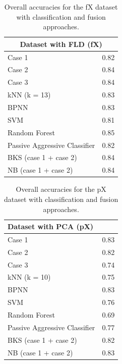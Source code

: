 \documentclass{article}
\begin{document}
\begin{table}[h]
\centering
\begin{tabular}{@{}ll@{}}
\toprule
\multicolumn{2}{c}{Dataset with FLD (fX)}                    \\ \midrule
Case 1                          & 0.82                  
\\
Case 2                          & 0.84                  \\
Case 3                          & 0.84                  \\
kNN (k = 13)                    & 0.83                  \\
BPNN                            & 0.83                  \\
SVM                             & 0.81                  \\
Random Forest                   & 0.85                  \\
Passive Aggressive Classifier   & 0.82                  \\
BKS (case 1 + case 2)           & 0.84                  \\
NB (case 1 + case 2)            & 0.84                  \\ \bottomrule
\end{tabular}
\caption{Overall accuracies for the fX dataset with classification and fusion approaches.}
\label{tab:acccf2}
\end{table}

\begin{table}[H]
\centering
\begin{tabular}{@{}ll@{}}
\toprule
\multicolumn{2}{l}{Dataset with PCA (pX)} \\ \midrule
Case 1                          & 0.83                  
\\
Case 2                          & 0.82                  \\
Case 3                          & 0.74                  \\
kNN (k = 10)                    & 0.75                  \\
BPNN                            & 0.83                  \\
SVM                             & 0.76                  \\
Random Forest                   & 0.69                  \\
Passive Aggressive Classifier   & 0.77                  \\
BKS (case 1 + case 2)           & 0.82                  \\
NB (case 1 + case 2)            & 0.83                  \\\bottomrule
\end{tabular}
\caption{Overall accuracies for the pX dataset with classification and fusion approaches.}
\label{tab:acccf3}
\end{table}
\end{document}
